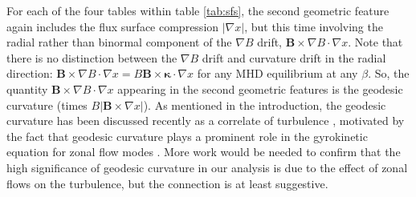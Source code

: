 \documentclass{jpp}
\begin{document}
For each of the four tables within table \ref{tab:sfs}, the second geometric feature again includes the flux surface compression $|\nabla x|$, but this time involving the radial rather than binormal component of the $\nabla B$ drift, $\mathbf{B}\times\nabla B\cdot\nabla x$.
Note that there is no distinction between the $\nabla B$ drift and curvature drift in the radial direction: $\mathbf{B}\times\nabla B \cdot\nabla x = B\mathbf{B}\times\mathbf{\kappa}\cdot\nabla x$ for any MHD equilibrium at any $\beta$.
So, the quantity $\mathbf{B}\times\nabla B\cdot\nabla x$ appearing in the second geometric features is the geodesic curvature (times $B|\mathbf{B}\times\nabla x|$).
As mentioned in the introduction, the geodesic curvature has been discussed recently as a correlate of turbulence \citep{xanthopoulos2011zonal, NAKATA2022}, motivated by the fact that geodesic curvature plays a prominent role in the gyrokinetic equation for zonal flow modes \citep{rosenbluth1998poloidal}.
More work would be needed to confirm that the high significance of geodesic curvature in our analysis is due to the effect of zonal flows on the turbulence, but the connection is at least suggestive.
\end{document}
